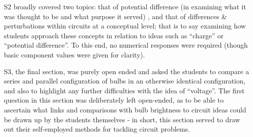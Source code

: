 \documentclass[a4paper,openany,nobib]{tufte-book}
\begin{document}
S2 broadly covered two topics:
that of potential difference (in examining what it was thought to be and what purpose it served)
, and that of differences \& perturbations within circuits at a conceptual level; that is to say examining how students approach these concepts in relation to ideas such as ``charge'' or ``potential difference''. 
To this end, no numerical responses were required (though basic component values were given for clarity).

S3, the final section, was purely open ended and asked the students to compare a series and parallel configuration of bulbs in an otherwise identical configuration, and also to highlight any further difficulties with the idea of ``voltage''.
The first question in this section was deliberately left open-ended, as to be able to ascertain what links and comparisons with bulb brightness to circuit ideas could be drawn up by the students themselves - in short, this section served to draw out their self-employed methods for tackling circuit problems.
\nocite{*}
\printbibliography
\end{document}
